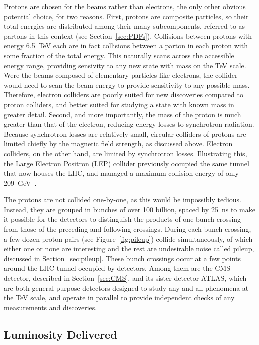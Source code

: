   Protons are chosen for the beams rather than electrons, the only other obvious potential choice, for two reasons.
  First, protons are composite particles, so their total energies are distributed among their many subcomponents, referred to as partons in this context (see Section~\ref{sec:PDFs}).
  Collisions between protons with energy 6.5~TeV each are in fact collisions between a parton in each proton with some fraction of the total energy.
  This naturally scans across the accessible energy range, providing sensivity to any new state with mass on the TeV scale.
  Were the beams composed of elementary particles like electrons, the collider would need to scan the beam energy to provide sensitivity to any possible mass.
  Therefore, electron colliders are poorly suited for new discoveries compared to proton colliders, and better suited for studying a state with known mass in greater detail.
  Second, and more importantly, the mass of the proton is much greater than that of the electron, reducing energy losses to synchrotron radiation.
  Because synchrotron losses are relatively small, circular colliders of protons are limited chiefly by the magnetic field strength, as discussed above.
  Electron colliders, on the other hand, are limited by synchrotron losses.
  Illustrating this, the Large Electron Positron (LEP) collider previously occupied the same tunnel that now houses the LHC, and managed a maximum collision energy of only 209~GeV~\cite{lep_chargino}.

  The protons are not collided one-by-one, as this would be impossibly tedious.
  Instead, they are grouped in bunches of over 100 billion, spaced by 25~ns to make it possible for the detectors to distinguish the products of one bunch crossing from those of the preceding and following crossings.
  During each bunch crossing, a few dozen proton pairs (see Figure~\ref{fig:pileup}) collide simultaneously, of which either one or none are interesting and the rest are undesirable noise called pileup, discussed in Section~\ref{sec:pileup}.
  These bunch crossings occur at a few points around the LHC tunnel occupied by detectors.
  Among them are the CMS detector, described in Section~\ref{sec:CMS}, and its sister detector ATLAS, which are both general-purpose detectors designed to study any and all phenomena at the TeV scale, and operate in parallel to provide independent checks of any measurements and discoveries.

  \subsection{Luminosity Delivered} \label{sec:lumi}


